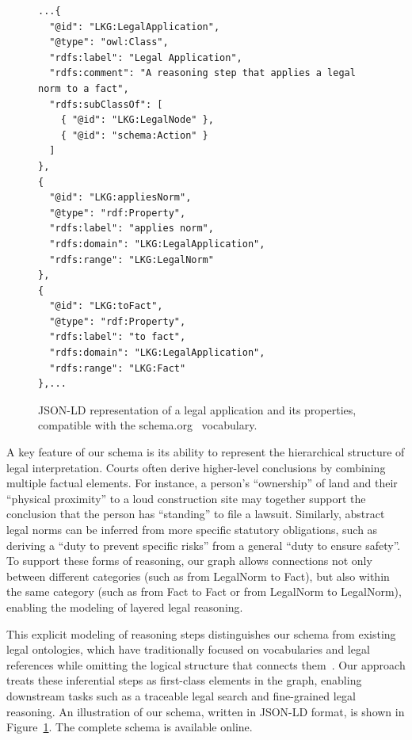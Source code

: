 \documentclass[11pt]{article}
\begin{document}
\begin{figure}[htbp]
  \centering
  \begin{minipage}{\linewidth}
    \begin{lstlisting}[language=jsonld,label={fig:legalapplication-jsonld}]
...{
  "@id": "LKG:LegalApplication",
  "@type": "owl:Class",
  "rdfs:label": "Legal Application",
  "rdfs:comment": "A reasoning step that applies a legal norm to a fact",
  "rdfs:subClassOf": [
    { "@id": "LKG:LegalNode" },
    { "@id": "schema:Action" }
  ]
},
{
  "@id": "LKG:appliesNorm",
  "@type": "rdf:Property",
  "rdfs:label": "applies norm",
  "rdfs:domain": "LKG:LegalApplication",
  "rdfs:range": "LKG:LegalNorm"
},
{
  "@id": "LKG:toFact",
  "@type": "rdf:Property",
  "rdfs:label": "to fact",
  "rdfs:domain": "LKG:LegalApplication",
  "rdfs:range": "LKG:Fact"
},...
    \end{lstlisting}
  \end{minipage}
  \caption{JSON-LD representation of a legal application and its properties, compatible with the schema.org~\cite{schemaorg} vocabulary.}
  \label{fig:legalapplication-jsonld}
\end{figure}



A key feature of our schema is its ability to represent the hierarchical structure of legal interpretation. Courts often derive higher-level conclusions by combining multiple factual elements. For instance, a person's ``ownership'' of land and their ``physical proximity'' to a loud construction site may together support the conclusion that the person has ``standing'' to file a lawsuit. Similarly, abstract legal norms can be inferred from more specific statutory obligations, such as deriving a ``duty to prevent specific risks'' from a general ``duty to ensure safety''. To support these forms of reasoning, our graph allows connections not only between different categories (such as from LegalNorm to Fact), but also within the same category (such as from Fact to Fact or from LegalNorm to LegalNorm), enabling the modeling of layered legal reasoning.




This explicit modeling of reasoning steps distinguishes our schema from existing legal ontologies, which have traditionally focused on vocabularies and legal references while omitting the logical structure that connects them~\cite{Hoekstra2007LKIF,Sakhaee2021LegislationNetwork}. Our approach treats these inferential steps as first-class elements in the graph, enabling downstream tasks such as a traceable legal search and fine-grained legal reasoning. An illustration of our schema, written in JSON-LD format, is shown in Figure~\ref{fig:legalapplication-jsonld}. The complete schema is available online.
\end{document}

